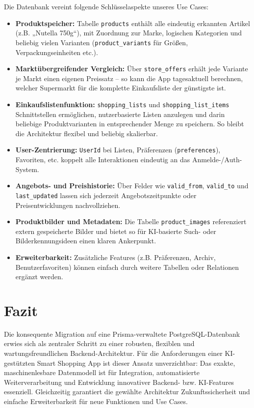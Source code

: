 Die Datenbank vereint folgende Schlüsselaspekte unseres Use Cases:
\begin{itemize}
    \item \textbf{Produktspeicher:} Tabelle \texttt{products} enthält alle eindeutig erkannten Artikel (z.B. „Nutella 750g“), mit Zuordnung zur Marke, logischen Kategorien und beliebig vielen Varianten (\texttt{product\_variants} für Größen, Verpackungseinheiten etc.).
    \item \textbf{Marktübergreifender Vergleich:} Über \texttt{store\_offers} erhält jede Variante je Markt einen eigenen Preissatz – so kann die App tagesaktuell berechnen, welcher Supermarkt für die komplette Einkaufsliste der günstigste ist.
    \item \textbf{Einkaufslistenfunktion:} \texttt{shopping\_lists} und \texttt{shopping\_list\_items} Schnittstellen ermöglichen, nutzerbasierte Listen anzulegen und darin beliebige Produktvarianten in entsprechender Menge zu speichern. So bleibt die Architektur flexibel und beliebig skalierbar.
    \item \textbf{User-Zentrierung:} \texttt{UserId} bei Listen, Präferenzen (\texttt{preferences}), Favoriten, etc. koppelt alle Interaktionen eindeutig an das Anmelde-/Auth-System.
    \item \textbf{Angebots- und Preishistorie:} Über Felder wie \texttt{valid\_from}, \texttt{valid\_to} und \texttt{last\_updated} lassen sich jederzeit Angebotszeitpunkte oder Preisentwicklungen nachvollziehen.
    \item \textbf{Produktbilder und Metadaten:} Die Tabelle \texttt{product\_images} referenziert extern gespeicherte Bilder und bietet so für KI-basierte Such- oder Bilderkennungsideen einen klaren Ankerpunkt.
    \item \textbf{Erweiterbarkeit:} Zusätzliche Features (z.B. Präferenzen, Archiv, Benutzerfavoriten) können einfach durch weitere Tabellen oder Relationen ergänzt werden.
\end{itemize}

\section{Fazit}

Die konsequente Migration auf eine Prisma-verwaltete PostgreSQL-Datenbank erwies sich als zentraler Schritt zu einer robusten, flexiblen und wartungsfreundlichen Backend-Architektur. Für die Anforderungen einer KI-gestützten Smart Shopping App ist dieser Ansatz unverzichtbar: Das exakte, maschinenlesbare Datenmodell ist für Integration, automatisierte Weiterverarbeitung und Entwicklung innovativer Backend- bzw. KI-Features essenziell. Gleichzeitig garantiert die gewählte Architektur Zukunftssicherheit und einfache Erweiterbarkeit für neue Funktionen und Use Cases.

